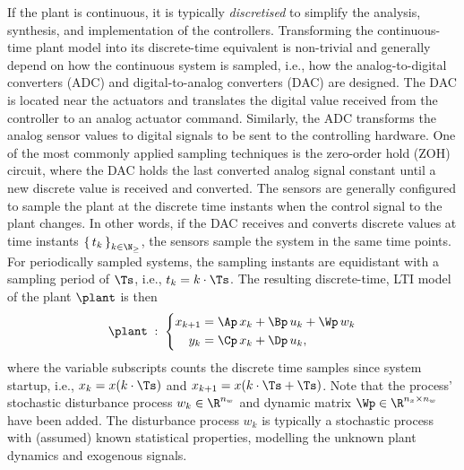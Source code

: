 If the plant is continuous, it is typically \emph{discretised} to simplify the analysis, synthesis, and implementation of the controllers.
Transforming the continuous-time plant model into its discrete-time equivalent is non-trivial and generally depend on how the continuous system is sampled, i.e., how the analog-to-digital converters (ADC) and digital-to-analog converters (DAC) are designed.
The DAC is located near the actuators and translates the digital value received from the controller to an analog actuator command.
Similarly, the ADC transforms the analog sensor values to digital signals to be sent to the controlling hardware.
One of the most commonly applied sampling techniques is the zero-order hold (ZOH) circuit, where the DAC holds the last converted analog signal constant until a new discrete value is received and converted.
The sensors are generally configured to sample the plant at the discrete time instants when the control signal to the plant changes.
In other words, if the DAC receives and converts discrete values at time instants $\left\{\, t_k \,\right\}_{k\in\N_{\geq}}$, the sensors sample the system in the same time points.
For periodically sampled systems, the sampling instants are equidistant with a sampling period of $\Ts$, i.e., $t_k = k\cdot \Ts$.
The resulting discrete-time, LTI model of the plant $\plant$ is then
%
\begin{equation}%
    \label{eq:discrete-lti-plant}%
    \plant \; : \; \left\{\begin{aligned}
        x_{k+1} &= \Ap\,x_k + \Bp\,u_k + \Wp\, w_k\\
        y_k &= \Cp\,x_k + \Dp\,u_k, \\
    \end{aligned}\right.
\end{equation}
%
where the variable subscripts counts the discrete time samples since system startup, i.e., $x_k = x(k\cdot \Ts)$ and $x_{k+1} = x(k\cdot \Ts + \Ts)$.
Note that the process' stochastic disturbance process $w_k \in \R^{n_w}$ and dynamic matrix $\Wp \in \R^{n_x \times n_w}$ have been added.
The disturbance process $w_k$ is typically a stochastic process with (assumed) known statistical properties, modelling the unknown plant dynamics and exogenous signals.

